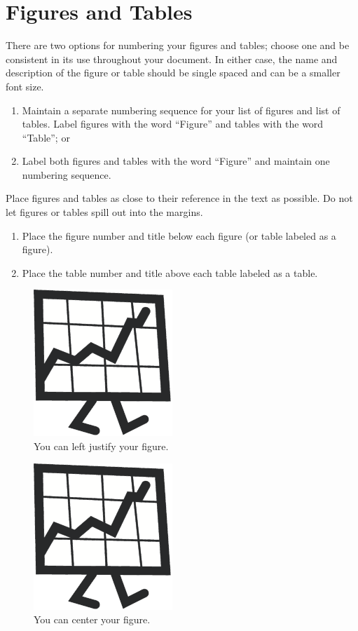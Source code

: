 \section{Figures and Tables}

There are two options for numbering your figures and tables; choose one and be consistent in its use throughout your document.
In either case, the name and description of the figure or table should be single spaced and can be a smaller font size.

\begin{enumerate}
	\item Maintain a separate numbering sequence for your list of figures and list of tables.
Label figures with the word ``Figure'' and tables with the word ``Table''; or
	\item Label both figures and tables with the word ``Figure'' and maintain one numbering sequence.
\end{enumerate}

Place figures and tables as close to their reference in the text as possible.
Do not let figures or tables spill out into the margins.

\begin{enumerate}
	\item Place the figure number and title below each figure (or table labeled as a figure).
	\item Place the table number and title above each table labeled as a table.
\end{enumerate}

\begin{figure}
  \includegraphics{figures/just-a-figure}
  \caption[Left justified figure]{You can left justify your figure.}
  \label{fig:left-justified}
\end{figure}

\begin{figure}
  \centering
  \includegraphics{figures/just-a-figure}
  \caption[Centered figure]{You can center your figure.}
  \label{fig:centered}
\end{figure}


